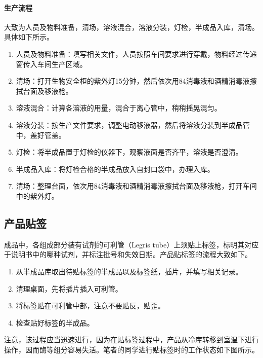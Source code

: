 \documentclass[cn,black,12pt,normal]{elegantnote}
\begin{document}
\paragraph{生产流程} 大致为人员及物料准备，清场，溶液混合，溶液分装，灯检，半成品入库，清场。具体如下所示。
\begin{enumerate}
    \item 人员及物料准备：填写相关文件，人员按照车间要求进行穿戴，物料经过传递窗传入车间生产区域。
    \item 清场：打开生物安全柜的紫外灯15分钟，然后依次用84消毒液和酒精消毒液擦拭台面及移液枪。
    \item 溶液混合：计算各溶液的用量，混合于离心管中，稍稍摇晃混匀。
    \item 溶液分装：按生产文件要求，调整电动移液器，然后将溶液分装到半成品管中，盖好管盖。
    \item 灯检：将半成品置于灯检的仪器下，观察液面是否齐平，溶液是否澄清。
    \item 半成品入库：将灯检合格的半成品放入自封口袋中，办理入库。
    \item 清场：整理台面，依次用84消毒液和酒精消毒液擦拭台面及移液枪，打开车间中的紫外灯。
\end{enumerate}

\subsection{产品贴签}
成品中，各组成部分装有试剂的可利管（Legris tube）上须贴上标签，标明其对应于说明书中的哪种试剂，并标注批号和失效日期。产品贴标签的流程大致如下。

\begin{enumerate}
    \item 从半成品库取出待贴标签的半成品以及标签纸，插片，并填写相关记录。
    \item 清理桌面，先将插片插入可利管。
    \item 将标签贴在可利管中部，注意不要贴反，贴歪。
    \item 检查贴好标签的半成品。
\end{enumerate}
注意，该过程应当迅速进行，因为在贴标签过程中，产品从冷库转移到室温下进行操作，因而酶等组分容易失活。笔者的同学进行贴标签时的工作状态如下图所示。
\end{document}
